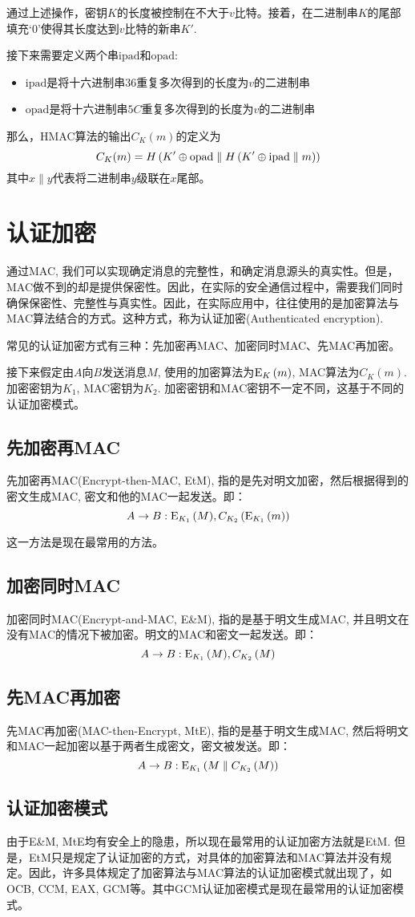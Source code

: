 通过上述操作，密钥$K$的长度被控制在不大于$v$比特。接着，在二进制串$K$的尾部填充`0'使得其长度达到$v$比特的新串$K'$.\par
接下来需要定义两个串$\mathrm{ipad}$和$\mathrm{opad}$:
\begin{itemize}
	\item $\mathrm{ipad}$是将十六进制串$36$重复多次得到的长度为$v$的二进制串
	\item $\mathrm{opad}$是将十六进制串$5C$重复多次得到的长度为$v$的二进制串
\end{itemize}

那么，HMAC算法的输出$C_K(m)$的定义为
\begin{equation}
	C_K(m)=H\left( {K'\oplus\mathrm{opad}\parallel H\left( {K'\oplus\mathrm{ipad}\parallel m}\right)}\right)
\end{equation}
其中$x\parallel y$代表将二进制串$y$级联在$x$尾部。
\section{认证加密}
通过MAC, 我们可以实现确定消息的完整性，和确定消息源头的真实性。但是，MAC做不到的却是提供保密性。因此，在实际的安全通信过程中，需要我们同时确保保密性、完整性与真实性。因此，在实际应用中，往往使用的是加密算法与MAC算法结合的方式。这种方式，称为认证加密(Authenticated encryption).\par
常见的认证加密方式有三种：先加密再MAC、加密同时MAC、先MAC再加密。\par
接下来假定由$A$向$B$发送消息$M$, 使用的加密算法为${\mathrm{E}_{K}\left({m}\right)}$, MAC算法为$C_K(m)$. 加密密钥为$K_1$, MAC密钥为$K_2$. 加密密钥和MAC密钥不一定不同，这基于不同的认证加密模式。
\subsection{先加密再MAC}
先加密再MAC(Encrypt-then-MAC, EtM), 指的是先对明文加密，然后根据得到的密文生成MAC, 密文和他的MAC一起发送。即：
\[A\to B: {\mathrm{E}_{K_1}\left({M}\right)}, C_{K_2}\left( {{\mathrm{E}_{K_1}\left({m}\right)}}\right)\]

这一方法是现在最常用的方法。
\subsection{加密同时MAC}
加密同时MAC(Encrypt-and-MAC, E\&M), 指的是基于明文生成MAC, 并且明文在没有MAC的情况下被加密。明文的MAC和密文一起发送。即：
\[A\to B:{\mathrm{E}_{K_1}\left({M}\right)}, C_{K_2}\left( {M}\right)\]
\subsection{先MAC再加密}
先MAC再加密(MAC-then-Encrypt, MtE), 指的是基于明文生成MAC, 然后将明文和MAC一起加密以基于两者生成密文，密文被发送。即：
\[A\to B:{\mathrm{E}_{K_1}\left({M\parallel C_{K_2}\left( {M}\right)}\right)}\]
\subsection{认证加密模式}
由于E\&M, MtE均有安全上的隐患，所以现在最常用的认证加密方法就是EtM. 但是，EtM只是规定了认证加密的方式，对具体的加密算法和MAC算法并没有规定。因此，许多具体规定了加密算法与MAC算法的认证加密模式就出现了，如OCB, CCM, EAX, GCM等。其中GCM认证加密模式是现在最常用的认证加密模式。